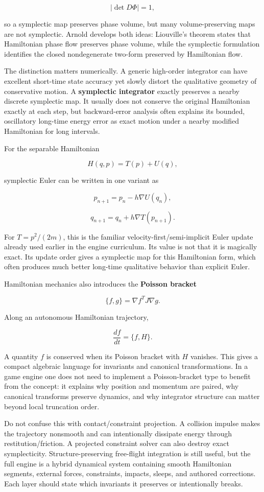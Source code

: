 \[
|\det D\Phi|=1,
\]

so a symplectic map preserves phase volume, but many volume-preserving maps are not symplectic. Arnold develops both ideas: Liouville's theorem states that Hamiltonian phase flow preserves phase volume, while the symplectic formulation identifies the closed nondegenerate two-form preserved by Hamiltonian flow.

The distinction matters numerically. A generic high-order integrator can have excellent short-time state accuracy yet slowly distort the qualitative geometry of conservative motion. A \textbf{symplectic integrator} exactly preserves a nearby discrete symplectic map. It usually does not conserve the original Hamiltonian exactly at each step, but backward-error analysis often explains its bounded, oscillatory long-time energy error as exact motion under a nearby modified Hamiltonian for long intervals.

For the separable Hamiltonian

\[
H(q,p)=T(p)+U(q),
\]

symplectic Euler can be written in one variant as

\[
p_{n+1}
=
p_n-h\nabla U(q_n),
\]

\[
q_{n+1}
=
q_n+h\nabla T(p_{n+1}).
\]

For \(T=p^2/(2m)\), this is the familiar velocity-first/semi-implicit Euler update already used earlier in the engine curriculum. Its value is not that it is magically exact. Its update order gives a symplectic map for this Hamiltonian form, which often produces much better long-time qualitative behavior than explicit Euler.

Hamiltonian mechanics also introduces the \textbf{Poisson bracket}

\[
\{f,g\}
=
\nabla f^T J\nabla g.
\]

Along an autonomous Hamiltonian trajectory,

\[
\frac{df}{dt}
=
\{f,H\}.
\]

A quantity \(f\) is conserved when its Poisson bracket with \(H\) vanishes. This gives a compact algebraic language for invariants and canonical transformations. In a game engine one does not need to implement a Poisson-bracket type to benefit from the concept: it explains why position and momentum are paired, why canonical transforms preserve dynamics, and why integrator structure can matter beyond local truncation order.

Do not confuse this with contact/constraint projection. A collision impulse makes the trajectory nonsmooth and can intentionally dissipate energy through restitution/friction. A projected constraint solver can also destroy exact symplecticity. Structure-preserving free-flight integration is still useful, but the full engine is a hybrid dynamical system containing smooth Hamiltonian segments, external forces, constraints, impacts, sleeps, and authored corrections. Each layer should state which invariants it preserves or intentionally breaks.

